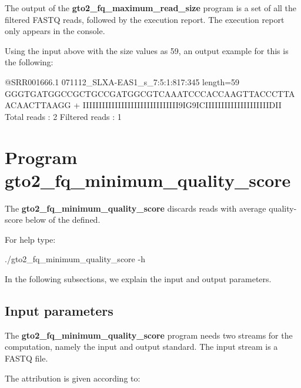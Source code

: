 \documentclass[11pt,]{krantz}
\newenvironment{Shaded}{\begin{snugshade}}{\end{snugshade}}
\newcommand{\ExtensionTok}[1]{#1}
\newcommand{\NormalTok}[1]{#1}
\begin{document}
The output of the \textbf{gto2\_fq\_maximum\_read\_size} program is a
set of all the filtered FASTQ reads, followed by the execution report.
The execution report only appears in the console.

Using the input above with the size values as 59, an output example for
this is the following:

\begin{Shaded}
\begin{Highlighting}[]
\ExtensionTok{@SRR001666.1}\NormalTok{ 071112_SLXA-EAS1_s_7:5:1:817:345 length=59}
\ExtensionTok{GGGTGATGGCCGCTGCCGATGGCGTCAAATCCCACCAAGTTACCCTTAACAACTTAAGG}
\ExtensionTok{+}
\ExtensionTok{IIIIIIIIIIIIIIIIIIIIIIIIIIIIII9IG9ICIIIIIIIIIIIIIIIIIIIIDII}
\ExtensionTok{Total}\NormalTok{ reads    : 2}
\ExtensionTok{Filtered}\NormalTok{ reads : 1}
\end{Highlighting}
\end{Shaded}

\section{Program
gto2\_fq\_minimum\_quality\_score}\label{program-gto2_fq_minimum_quality_score}

The \textbf{gto2\_fq\_minimum\_quality\_score} discards reads with
average quality-score below of the defined.

For help type:

\begin{Shaded}
\begin{Highlighting}[]
\ExtensionTok{./gto2_fq_minimum_quality_score}\NormalTok{ -h}
\end{Highlighting}
\end{Shaded}

In the following subsections, we explain the input and output
parameters.

\subsection*{Input parameters}\label{input-parameters-6}


The \textbf{gto2\_fq\_minimum\_quality\_score} program needs two streams
for the computation, namely the input and output standard. The input
stream is a FASTQ file.

The attribution is given according to:
\end{document}
